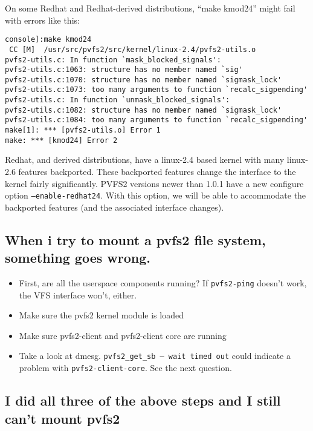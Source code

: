 \documentclass[11pt,letterpaper]{article}
\begin{document}
On some Redhat and Redhat-derived distributions, ``make kmod24'' might
fail with errors like this:

\begin{verbatim}
console]:make kmod24
 CC [M]  /usr/src/pvfs2/src/kernel/linux-2.4/pvfs2-utils.o
pvfs2-utils.c: In function `mask_blocked_signals':
pvfs2-utils.c:1063: structure has no member named `sig'
pvfs2-utils.c:1070: structure has no member named `sigmask_lock'
pvfs2-utils.c:1073: too many arguments to function `recalc_sigpending'
pvfs2-utils.c: In function `unmask_blocked_signals':
pvfs2-utils.c:1082: structure has no member named `sigmask_lock'
pvfs2-utils.c:1084: too many arguments to function `recalc_sigpending'
make[1]: *** [pvfs2-utils.o] Error 1
make: *** [kmod24] Error 2
\end{verbatim}

Redhat, and derived distributions, have a linux-2.4 based kernel with many
linux-2.6 features backported.  These backported features change the
interface to the kernel fairly significantly.  PVFS2 versions newer than
1.0.1 have a new configure option \texttt{--enable-redhat24}.  With this
option, we will be able to accommodate the backported features (and the
associated interface changes).

\subsection{When i try to mount a pvfs2 file system, something goes wrong.}

\begin{itemize}
\item First, are all the userspace components running?  If \texttt{pvfs2-ping}
doesn't work, the VFS interface won't, either.
\item Make sure the pvfs2 kernel module is loaded
\item Make sure pvfs2-client and pvfs2-client core are running
\item Take a look at dmesg.  \texttt{pvfs2\_get\_sb -- wait timed out} could
      indicate a problem with \texttt{pvfs2-client-core}.  See the next
      question.
\end{itemize}

\subsection{I did all three of the above steps and I still can't mount pvfs2}
\label{sec:nptl_and_mounting}
\end{document}

